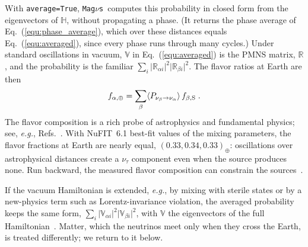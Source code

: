 \documentclass[final,5p,times,twocolumn,sort,compress]{elsarticle}
\makeatletter
\newcommand{\eg}{{\it e.g.}}
\newcommand{\eq}{Eq.}
\DeclareRobustCommand{\_}{%
  \ifmmode\nfss@text{\textunderscore}\else\textunderscore\allowbreak\fi}
\newcommand{\Refs}{Refs.}
\newcommand{\equ}[1]{\eq~(\ref{equ:#1})}
\newcommand{\magnus}{{\tt Mag}\ensuremath{\nu}{\tt s}}
\makeatother
\begin{document}
With {\tt average=True}, \magnus\ computes this probability in closed form from the eigenvectors of $\mathbb{H}$, without propagating a phase. (It returns the phase average of \equ{phase_average}, which over these distances equals \equ{averaged}, since every phase runs through many cycles.) Under standard oscillations in vacuum, $\mathbb{V}$ in \equ{averaged} is the PMNS matrix, $\mathbb{R}$, and the probability is the familiar $\sum_i \lvert \mathbb{R}_{\alpha i}\rvert^2 \lvert \mathbb{R}_{\beta i}\rvert^2$. The flavor ratios at Earth are then
\begin{equation}
 \label{equ:flavor_ratio_earth}
 f_{\alpha, \oplus}
 =
 \sum_\beta \langle P_{\nu_\beta \to \nu_\alpha}\rangle\, f_{\beta, {\rm S}} \;.
\end{equation}
The flavor composition is a rich probe of astrophysics and fundamental physics; see, \eg, \Refs~\cite{Esmaili:2009dz, Barenboim:2003jm, Beacom:2003nh, Kachelriess:2006ksy, Lipari:2007su, Hummer:2010ai, Bustamante:2015waa, Arguelles:2015dca, Rasmussen:2017ert, Bustamante:2019sdb, Ackermann:2019cxh, Ackermann:2019ows, Arguelles:2019rbn, Bustamante:2020bxp, Song:2020nfh, Liu:2023flr}. With NuFIT~6.1 best-fit values of the mixing parameters, the flavor fractions at Earth are nearly equal, $(0.33, 0.34, 0.33)_\oplus$: oscillations over astrophysical distances create a $\nu_\tau$ component even when the source produces none. Run backward, the measured flavor composition can constrain the sources\ \cite{Bustamante:2019sdb, Song:2020nfh, Liu:2023flr, IceCube:2025ole}.

If the vacuum Hamiltonian is extended, \eg, by mixing with sterile states or by a new-physics term such as Lorentz-invariance violation, the averaged probability keeps the same form, $\sum_i \lvert \mathbb{V}_{\alpha i}\rvert^2 \lvert \mathbb{V}_{\beta i}\rvert^2$, with $\mathbb{V}$ the eigenvectors of the full Hamiltonian\ \cite{Ahlers:2018yom, Ahlers:2020miq}. Matter, which the neutrinos meet only when they cross the Earth, is treated differently; we return to it below.
\end{document}
